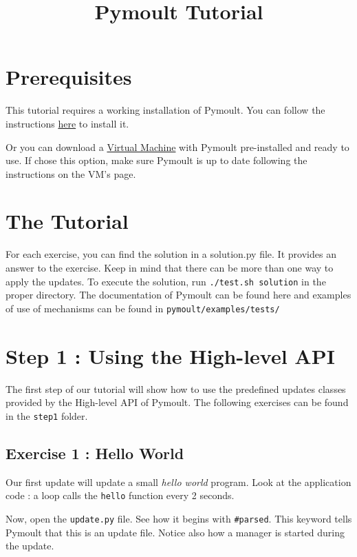 \documentclass{article}
\begin{document}
\title{Pymoult Tutorial}
\date{}
\maketitle

\section{Prerequisites}

This tutorial requires a working installation of Pymoult. You can
follow the instructions
\href{https://bitbucket.org/smartinezgd/pymoult/wiki/Home}{here} to
install it.

Or you can download a \href{https://bitbucket.org/smartinezgd/pymoult/wiki/Virtual\%20Machine}{Virtual Machine} with Pymoult pre-installed and
ready to use. If chose this option, make sure Pymoult is up to date
following the instructions on the VM's page.  

\section{The Tutorial}

For each exercise, you can find the solution in a solution.py file. It
provides an answer to the exercise. Keep in mind that there can be
more than one way to apply the updates.  To execute the solution, run
\texttt{./test.sh solution} in the proper directory.  The
documentation of Pymoult can be found here and examples of use of
mechanisms can be found in \texttt{pymoult/examples/tests/}

\section{Step 1 : Using the High-level API}

The first step of our tutorial will show how to use the predefined
updates classes provided by the High-level API of Pymoult. The
following exercises can be found in the \texttt{step1} folder. 

\subsection{Exercise 1 : Hello World}

Our first update will update a small \textit{hello world}
program. Look at the application code : a loop calls the
\texttt{hello} function every 2 seconds.

Now, open the \texttt{update.py} file. See how it begins with
\texttt{\#parsed}. This keyword tells Pymoult that this is an update
file. Notice also how a manager is started during the update.  
\end{document}
